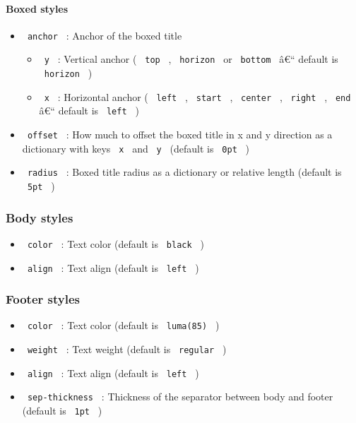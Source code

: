 \paragraph{Boxed styles}\label{boxed-styles}

\begin{itemize}
\tightlist
\item
  \texttt{\ anchor\ } : Anchor of the boxed title

  \begin{itemize}
  \tightlist
  \item
    \texttt{\ y\ } : Vertical anchor ( \texttt{\ top\ } ,
    \texttt{\ horizon\ } or \texttt{\ bottom\ } â€`` default is
    \texttt{\ horizon\ } )
  \item
    \texttt{\ x\ } : Horizontal anchor ( \texttt{\ left\ } ,
    \texttt{\ start\ } , \texttt{\ center\ } , \texttt{\ right\ } ,
    \texttt{\ end\ } â€`` default is \texttt{\ left\ } )
  \end{itemize}
\item
  \texttt{\ offset\ } : How much to offset the boxed title in x and y
  direction as a dictionary with keys \texttt{\ x\ } and \texttt{\ y\ }
  (default is \texttt{\ 0pt\ } )
\item
  \texttt{\ radius\ } : Boxed title radius as a dictionary or relative
  length (default is \texttt{\ 5pt\ } )
\end{itemize}

\subsubsection{Body styles}\label{body-styles}

\begin{itemize}
\tightlist
\item
  \texttt{\ color\ } : Text color (default is \texttt{\ black\ } )
\item
  \texttt{\ align\ } : Text align (default is \texttt{\ left\ } )
\end{itemize}

\subsubsection{Footer styles}\label{footer-styles}

\begin{itemize}
\tightlist
\item
  \texttt{\ color\ } : Text color (default is \texttt{\ luma(85)\ } )
\item
  \texttt{\ weight\ } : Text weight (default is \texttt{\ regular\ } )
\item
  \texttt{\ align\ } : Text align (default is \texttt{\ left\ } )
\item
  \texttt{\ sep-thickness\ } : Thickness of the separator between body
  and footer (default is \texttt{\ 1pt\ } )
\end{itemize}

